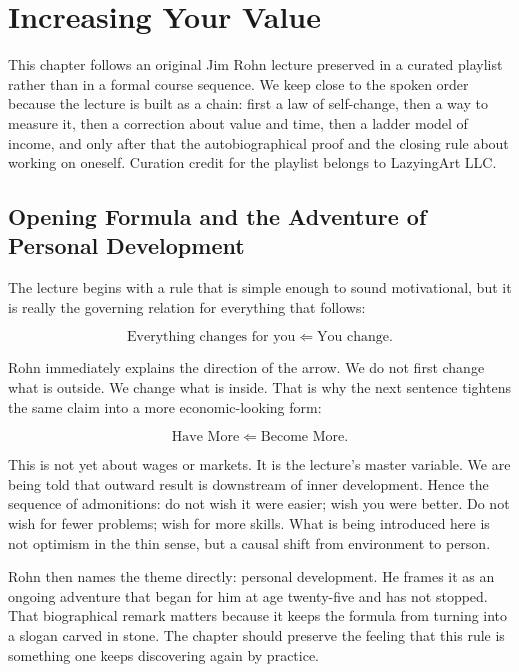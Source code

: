 \chapter{Increasing Your Value}

This chapter follows an original Jim Rohn lecture preserved in a curated playlist rather than in a formal course sequence. We keep close to the spoken order because the lecture is built as a chain: first a law of self-change, then a way to measure it, then a correction about value and time, then a ladder model of income, and only after that the autobiographical proof and the closing rule about working on oneself. Curation credit for the playlist belongs to LazyingArt LLC.

\section{Opening Formula and the Adventure of Personal Development}

The lecture begins with a rule that is simple enough to sound motivational, but it is really the governing relation for everything that follows:

\begin{equation}
\text{Everything changes for you} \Longleftarrow \text{You change}.
\end{equation}

Rohn immediately explains the direction of the arrow. We do not first change what is outside. We change what is inside. That is why the next sentence tightens the same claim into a more economic-looking form:

\begin{equation}
\text{Have More} \Longleftarrow \text{Become More}.
\end{equation}

This is not yet about wages or markets. It is the lecture's master variable. We are being told that outward result is downstream of inner development. Hence the sequence of admonitions: do not wish it were easier; wish you were better. Do not wish for fewer problems; wish for more skills. What is being introduced here is not optimism in the thin sense, but a causal shift from environment to person.

Rohn then names the theme directly: personal development. He frames it as an ongoing adventure that began for him at age twenty-five and has not stopped. That biographical remark matters because it keeps the formula from turning into a slogan carved in stone. The chapter should preserve the feeling that this rule is something one keeps discovering again by practice.

